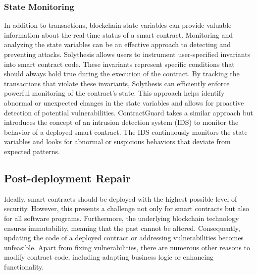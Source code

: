 \documentclass[manuscript,screen]{acmart}
\begin{document}
\subsubsection{State Monitoring}
In addition to transactions, blockchain state variables can provide valuable information about the real-time status of a smart contract. Monitoring and analyzing the state variables can be an effective approach to detecting and preventing attacks.
Solythesis \cite{LiCL20} allows users to instrument user-specified invariants into smart contract code. These invariants represent specific conditions that should always hold true during the execution of the contract. By tracking the transactions that violate these invariants, Solythesis can efficiently enforce powerful monitoring of the contract's state. This approach helps identify abnormal or unexpected changes in the state variables and allows for proactive detection of potential vulnerabilities.
ContractGuard \cite{WangHXZC20} takes a similar approach but introduces the concept of an intrusion detection system (IDS) to monitor the behavior of a deployed smart contract. The IDS continuously monitors the state variables and looks for abnormal or suspicious behaviors that deviate from expected patterns. 


\subsection{Post-deployment Repair}
Ideally, smart contracts should be deployed with the highest possible level of security. However, this presents a challenge not only for smart contracts but also for all software programs. Furthermore, the underlying blockchain technology ensures immutability, meaning that the past cannot be altered. Consequently, updating the code of a deployed contract or addressing vulnerabilities becomes unfeasible. Apart from fixing vulnerabilities, there are numerous other reasons to modify contract code, including adapting business logic or enhancing functionality.
\end{document}
